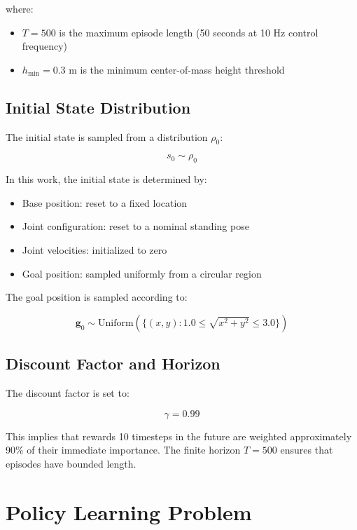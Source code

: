 \documentclass[12pt,a4paper]{article}
\begin{document}
\begin{itemize}
\begin{itemize}
where:
\begin{itemize}
\item $T = 500$ is the maximum episode length (50 seconds at 10 Hz control frequency)
\item $h_{\min} = 0.3 \text{ m}$ is the minimum center-of-mass height threshold
\end{itemize}

\subsection{Initial State Distribution}

The initial state is sampled from a distribution $\rho_0$:

\begin{equation}
s_0 \sim \rho_0
\end{equation}

In this work, the initial state is determined by:

\begin{itemize}
\item Base position: reset to a fixed location
\item Joint configuration: reset to a nominal standing pose
\item Joint velocities: initialized to zero
\item Goal position: sampled uniformly from a circular region
\end{itemize}

The goal position is sampled according to:

\begin{equation}
\mathbf{g}_0 \sim \text{Uniform}(\{(x, y) : 1.0 \leq \sqrt{x^2 + y^2} \leq 3.0\})
\end{equation}

\subsection{Discount Factor and Horizon}

The discount factor is set to:

\begin{equation}
\gamma = 0.99
\end{equation}

This implies that rewards 10 timesteps in the future are weighted approximately 90\% of their immediate importance. The finite horizon $T = 500$ ensures that episodes have bounded length.

\section{Policy Learning Problem}


\end{itemize}
\end{itemize}
\end{document}
